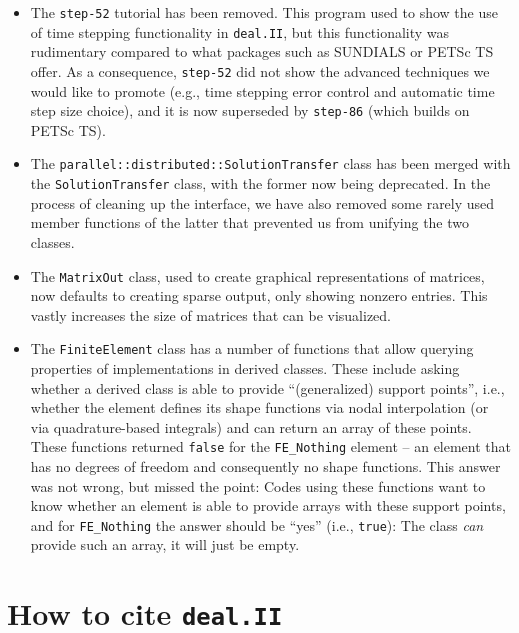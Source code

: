 \documentclass{ansarticle-preprint}
\newcommand{\specialword}[1]{\texttt{#1}}
\newcommand{\dealii}{{\specialword{deal.II}}\xspace}
\newcommand{\step}[1]{{\specialword{step-#1}}\xspace}
\begin{document}
\begin{itemize}
  \item The \step{52} tutorial has been removed. This program used to
    show the use of time stepping functionality in \dealii{}, but
    this functionality was rudimentary compared to what packages such
    as SUNDIALS or PETSc TS offer. As a consequence, \step{52} did
    not show the advanced techniques we would like to promote (e.g.,
    time stepping error control and automatic time step size choice), and it
    is now superseded by \step{86} (which builds on PETSc TS).
  \item The \texttt{parallel::distributed::SolutionTransfer} class has
    been merged with the \texttt{SolutionTransfer} class, with the
    former now being deprecated. In the process of cleaning up the
    interface, we have also removed some rarely used member functions
    of the latter that prevented us from unifying the two classes.
  \item The \texttt{MatrixOut} class, used to create graphical
    representations of matrices, now defaults to creating sparse
    output, only showing nonzero entries. This vastly increases the
    size of matrices that can be visualized.
  \item The \texttt{FiniteElement} class has a number of functions
    that allow querying properties of implementations in derived
    classes. These include asking whether a derived class is able to provide
    ``(generalized) support points'', i.e., whether the element
    defines its shape functions via nodal interpolation (or via
    quadrature-based integrals) and can return an array of these
    points. These functions returned \texttt{false} for the
    \texttt{FE\_Nothing} element -- an element that has no degrees of
    freedom and consequently no shape functions. This answer was not
    wrong, but missed the point: Codes using these functions want to
    know whether an element is able to provide arrays with these
    support points, and for \texttt{FE\_Nothing} the answer should be
    ``yes'' (i.e., \texttt{true}): The class \textit{can} provide such
    an array, it will just be empty.
\end{itemize}



\section{How to cite \dealii}
\label{sec:cite}
\end{document}
